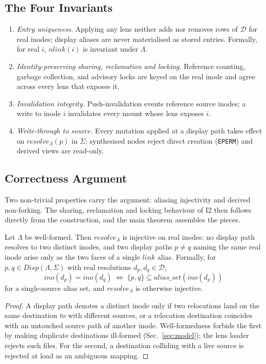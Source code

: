 \documentclass[numberedsection,acmtos]{acmart}
\begin{document}
\subsection{The Four Invariants}\label{sec:inv}

\begin{enumerate}[label=\textbf{(I\arabic*)}]
  \item \emph{Entry uniqueness.} Applying any lens neither adds nor removes rows
          of $\mathcal{D}$ for real inodes; display aliases are never
          materialised as stored entries. Formally, for real $i$,
          $\mathit{nlink}(i)$ is invariant under $\Lambda$.
  \item \emph{Identity-preserving sharing, reclamation and locking.} Reference
          counting, garbage collection, and advisory locks are keyed on the real
          inode and agree across every lens that exposes it.
  \item \emph{Invalidation integrity.} Push-invalidation events reference source
          inodes; a write to inode $i$ invalidates every mount whose lens
          exposes $i$.
  \item \emph{Write-through to source.} Every mutation applied at a display
          path takes effect on $\mathit{resolve}_\Lambda(p)$ in $\Sigma$;
          synthesised nodes reject direct creation (\texttt{EPERM}) and derived
          views are read-only.
\end{enumerate}

\subsection{Correctness Argument}\label{sec:lemmas}

Two non-trivial properties carry the argument: aliasing injectivity and
derived non-forking. The sharing, reclamation and locking behaviour of I2
then follows directly from the construction, and the main theorem assembles
the pieces.

\begin{lemma}\label{lem:nocollide}
Let $\Lambda$ be well-formed. Then $\mathit{resolve}_\Lambda$ is injective on
real inodes: no display path resolves to two distinct inodes, and two display
paths $p \neq q$ naming the same real inode arise only as the two faces of a
single $\mathit{link}$ alias. Formally, for $p,q \in \mathit{Disp}(\Lambda,\Sigma)$
with real resolutions $d_p, d_q \in \mathcal{D}$,
\[
  \mathit{ino}(d_p) = \mathit{ino}(d_q)
  \;\Longleftrightarrow\;
  \{p,q\} \subseteq \mathit{alias\_set}(\mathit{ino}(d_p))
\]
for a single-source alias set, and $\mathit{resolve}_\Lambda$ is otherwise
injective.
\end{lemma}
\begin{proof}
A display path denotes a distinct inode only if two relocations land on the same
destination $\mathit{to}$ with different sources, or a relocation destination
coincides with an untouched source path of another inode. Well-formedness
forbids the first by making duplicate destinations ill-formed (Sec.~\ref{sec:model});
the lens loader rejects such files. For the second, a destination
colliding with a live source is rejected at load as an ambiguous mapping.
\end{proof}
\end{document}
